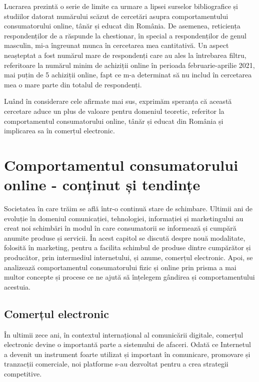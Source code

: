 \documentclass[a4paper, 12pt]{article}
\begin{document}
	\quad Lucrarea prezintă o serie de limite ca urmare a lipsei surselor bibliografice și studiilor datorat numărului scăzut de cercetări asupra comportamentului consumatorului online, tânăr și educat din România. De asemenea, reticiența respondenților de a răspunde la chestionar, în special a respondenților de genul masculin, mi-a îngreunat munca în cercetarea mea cantitativă. Un aspect neașteptat a fost numărul mare de respondenți care au ales la întrebarea filtru, referitoare la numărul minim de achiziții online în perioada februarie-aprilie 2021, mai puțin de 5 achiziții online, fapt ce m-a determinat să nu includ în cercetarea mea o mare parte din totalul de respondenți.
	
	\quad Luând în considerare cele afirmate mai sus, exprimăm speranța că această cercetare aduce un plus de valoare pentru domeniul teoretic, referitor la comportamentul consumatorului online, tânăr și educat din România și implicarea sa în comerțul electronic.
		
	\newpage
	\setcounter{section}{0}
	\section{Comportamentul consumatorului online - conținut și tendințe}
	
	\quad\quad Societatea în care trăim se află într-o continuă stare de schimbare. Ultimii ani de evoluție în domeniul comunicației, tehnologiei, informației și marketingului au creat noi schimbări în modul în care consumatorii se informează și cumpără anumite produse și servicii. În acest capitol se discută despre nouă modalitate, folosită în marketing, pentru a facilita schimbul de produse dintre cumpărător și producător, prin intermediul internetului, și anume, comerțul electronic. Apoi, se analizează comportamentul consumatorului fizic și online prin prisma a mai multor concepte și procese ce ne ajută să înțelegem gândirea și comportamentului acestuia. 

		\subsection{Comerțul electronic}
	\quad \quad\space În ultimii zece ani, în contextul internațional al comunicării digitale, comerțul electronic devine o importantă parte a sistemului de afaceri. Odată ce Internetul a devenit un instrument foarte utilizat și important în comunicare, promovare și tranzacții comerciale, noi platforme s-au dezvoltat pentru a crea strategii competitive.
	
\end{document}
